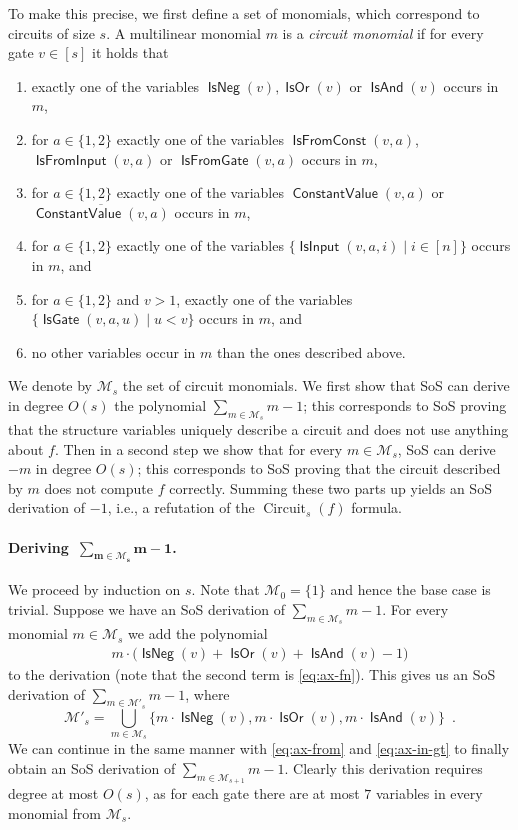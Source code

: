 \documentclass[10pt,a4paper]{article}
\theoremstyle{plain}
\theoremstyle{remark}
\theoremstyle{definition}
\newcommand{\pa}[1]{}
\newcommand{\eqperiod}{\enspace .}
\newcommand{\set}[1]{\{#1\}}
\newcommand{\calM}{\mathcal{M}}
\newcommand{\vars}[1]{\mathsf{#1}}
\DeclareMathOperator{\circuit}{Circuit}
\DeclareMathOperator{\isneg}{\vars{IsNeg}}
\DeclareMathOperator{\isand}{\vars{IsAnd}}
\DeclareMathOperator{\isor}{\vars{IsOr}}
\DeclareMathOperator{\isfromconst}{\vars{IsFromConst}}
\DeclareMathOperator{\isfromvar}{\vars{IsFromInput}}
\DeclareMathOperator{\isfromgate}{\vars{IsFromGate}}
\DeclareMathOperator{\constval}{\vars{ConstantValue}}
\DeclareMathOperator{\isvar}{\vars{IsInput}}
\DeclareMathOperator{\isgate}{\vars{IsGate}}
\begin{document}
To make this precise, we first define a set of monomials, which correspond
to circuits of size $s$. A multilinear monomial $m$ is a \emph{circuit
  monomial} if for every gate $v \in [s]$ it holds that
\begin{enumerate}
\item exactly one of the variables $\isneg(v), \isor(v)$ or $\isand(v)$ occurs
  in $m$,
\item for $a \in \set{1,2}$ exactly one of the variables
  $\isfromconst(v, a)$, $\isfromvar(v, a)$ or $\isfromgate(v, a)$ occurs
  in $m$,
\item for $a \in \set{1,2}$ exactly one of the variables
  $\constval(v, a)$ or $\overline{\constval(v, a)}$ occurs in $m$,
\item for $a \in \set{1,2}$ exactly one of the variables
  $\set{\isvar(v,a,i) \mid i \in [n]}$
  occurs in $m$, and
\item for $a \in \set{1,2}$ and $v > 1$, exactly one of the variables
  $\set{\isgate(v,a,u) \mid u < v}$
  occurs in $m$, and
  \item no other variables occur in $m$ than the ones described
    above.
\end{enumerate}
We denote by $\calM_s$ the set of circuit monomials. We first show
that SoS can derive in degree $O(s)$ the polynomial
$\sum_{m \in \calM_s} m - 1$; this corresponds to SoS proving that
the structure variables uniquely describe a circuit and does not use
anything about $f$.  Then in a second step we show that for every
$m \in \calM_s$, SoS can derive $-m$ in degree $O(s)$; this
corresponds to SoS proving that the circuit described by $m$ does not
compute $f$ correctly.  Summing these two parts up yields an SoS
derivation of $-1$, i.e., a refutation of the $\circuit_s(f)$ formula.

\pa{Here we still talk about SoS  derivations so we can't remove it from prelims}

\paragraph{Deriving~$\bm{\sum_{m \in \calM_s} m - 1}$.} We proceed
by induction on $s$. Note that $\calM_0 = \set{1}$ and hence the base
case is trivial. Suppose we have an SoS derivation of
$\sum_{m \in \calM_s} m - 1$. For every monomial $m \in \calM_s$ we
add the polynomial
\begin{align}
  m \cdot \big(\isneg(v) +  \isor(v) + \isand(v) - 1\big)
\end{align}
to the derivation (note that the second term is \cref{eq:ax-fn}). This
gives us an SoS derivation of $\sum_{m \in \calM'_s} m - 1$, where
$$\calM'_s = \bigcup_{m \in \calM_s} \set{m \cdot \isneg(v), m \cdot \isor(v), m \cdot \isand(v)}\eqperiod$$ We can continue in the same manner with
\cref{eq:ax-from} and \cref{eq:ax-in-gt} to finally obtain an SoS
derivation of $\sum_{m \in \calM_{s+1}} m - 1$. Clearly this
derivation requires degree at most $O(s)$, as for each gate there are
at most $7$ variables in every monomial from $\calM_s$.
\end{document}
